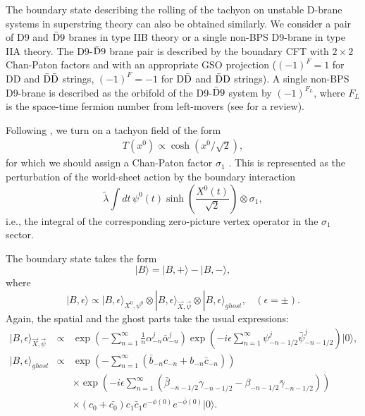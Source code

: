 \documentclass[a4paper,12pt]{article} \textheight=8.5truein
\begin{document}
The boundary state describing the rolling of the tachyon on
unstable D-brane systems in superstring theory can also be
obtained similarly. We consider a pair of D9 and ${\rm \bar{D}9}$
branes in type IIB theory or a single non-BPS D9-brane in type IIA
theory. The D9-${\rm \bar{D}9}$ brane pair is described by the
boundary CFT with $2\times 2$ Chan-Paton factors and with an
appropriate GSO projection ($(-1)^F =1$ for DD and ${\rm
\bar{D}\bar{D}}$ strings, $(-1)^F =-1$ for  ${\rm D\bar{D}}$ and
${\rm \bar{D}D}$ strings). A single non-BPS D9-brane is described
as the orbifold of the D9-${\rm \bar{D}9}$ system by $(-1)^{F_L}$,
where $F_L$ is the space-time fermion number from left-movers (see
\cite{Sen:1999mg} for a review).


Following \cite{Sen:2002in}, we turn on a tachyon field
of the form
\begin{eqnarray}
T(x^0)\propto \cosh(x^0/\sqrt{2}),
\end{eqnarray}
for which we should assign a Chan-Paton factor $\sigma_1$
\cite{Sen:1999mg}. This is represented as the perturbation of the
world-sheet action by the boundary interaction
\begin{equation}
  \tilde{\lambda} \int dt\, \psi^0(t) \sinh\left(
\frac{X^0 (t)}{\sqrt{2}}\right)\otimes\sigma_1,
\end{equation}
i.e., the integral of the corresponding zero-picture vertex
operator in the $\sigma_1$ sector.



The boundary state takes the form
\begin{equation}
  |B\rangle=|B,+\rangle-|B,-\rangle,
\end{equation}
where
\begin{equation}
 |B,\epsilon\rangle\propto|B,\epsilon\rangle_{X^0,\psi^0}
\otimes
|B,\epsilon\rangle_{\vec{X},\vec{\psi}}
\otimes
|B,\epsilon\rangle_{ghost},~~~~(\epsilon=\pm).
\end{equation}
Again, the spatial and the ghost parts take the usual expressions:
\begin{eqnarray}
  |B,\epsilon\rangle_{\vec{X},\vec{\psi}}&\propto&
\exp\left(
-\sum_{n=1}^{\infty}\frac{1}{n}\alpha^{j}_{-n}\bar{\alpha}^{j}_{-n}
\right)
\exp\left(
-i\epsilon\sum_{n=1}^{\infty}\psi^{j}_{-n-1/2}\bar{\psi}^{j}_{-n-1/2}
\right)
|0\rangle,\\
|B,\epsilon\rangle_{ghost}&\propto&\exp\left(-\sum_{n=1}^{\infty}(\bar{b}_{-n}c_{-n}
+b_{-n}\bar{c}_{-n})\right)\nonumber\\
&&
\times
\exp\left(
-i\epsilon\sum_{n=1}^{\infty}(\bar{\beta}_{-n-1/2}\gamma_{-n-1/2}
-\beta_{-n-1/2}\bar\gamma_{-n-1/2})
\right)\nonumber\\
&&\times
(c_0+\bar{c_0})c_1\bar{c}_1
e^{-\phi(0)}e^{-\bar{\phi}(0)}|0\rangle.
\end{eqnarray}
\end{document}

